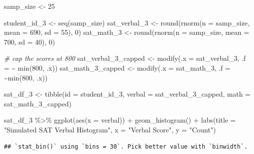\documentclass[
]{book}
\newenvironment{Shaded}{\begin{snugshade}}{\end{snugshade}}
\newcommand{\AttributeTok}[1]{\textcolor[rgb]{0.77,0.63,0.00}{#1}}
\newcommand{\CommentTok}[1]{\textcolor[rgb]{0.56,0.35,0.01}{\textit{#1}}}
\newcommand{\DecValTok}[1]{\textcolor[rgb]{0.00,0.00,0.81}{#1}}
\newcommand{\FunctionTok}[1]{\textcolor[rgb]{0.00,0.00,0.00}{#1}}
\newcommand{\NormalTok}[1]{#1}
\newcommand{\OtherTok}[1]{\textcolor[rgb]{0.56,0.35,0.01}{#1}}
\newcommand{\SpecialCharTok}[1]{\textcolor[rgb]{0.00,0.00,0.00}{#1}}
\newcommand{\StringTok}[1]{\textcolor[rgb]{0.31,0.60,0.02}{#1}}
\begin{document}
\begin{Shaded}
\begin{Highlighting}[]
\NormalTok{samp\_size }\OtherTok{\textless{}{-}} \DecValTok{25}

\NormalTok{student\_id\_3 }\OtherTok{\textless{}{-}} \FunctionTok{seq}\NormalTok{(samp\_size)}
\NormalTok{sat\_verbal\_3 }\OtherTok{\textless{}{-}} \FunctionTok{round}\NormalTok{(}\FunctionTok{rnorm}\NormalTok{(}\AttributeTok{n =}\NormalTok{ samp\_size, }\AttributeTok{mean =} \DecValTok{690}\NormalTok{, }\AttributeTok{sd =} \DecValTok{55}\NormalTok{), }\DecValTok{0}\NormalTok{)}
\NormalTok{sat\_math\_3 }\OtherTok{\textless{}{-}} \FunctionTok{round}\NormalTok{(}\FunctionTok{rnorm}\NormalTok{(}\AttributeTok{n =}\NormalTok{ samp\_size, }\AttributeTok{mean =} \DecValTok{700}\NormalTok{, }\AttributeTok{sd =} \DecValTok{40}\NormalTok{), }\DecValTok{0}\NormalTok{)}

\CommentTok{\# cap the scores at 800}
\NormalTok{sat\_verbal\_3\_capped }\OtherTok{\textless{}{-}} \FunctionTok{modify}\NormalTok{(}\AttributeTok{.x =}\NormalTok{ sat\_verbal\_3, }\AttributeTok{.f =} \SpecialCharTok{\textasciitilde{}} \FunctionTok{min}\NormalTok{(}\DecValTok{800}\NormalTok{, .x))}
\NormalTok{sat\_math\_3\_capped }\OtherTok{\textless{}{-}} \FunctionTok{modify}\NormalTok{(}\AttributeTok{.x =}\NormalTok{ sat\_math\_3, }\AttributeTok{.f =} \SpecialCharTok{\textasciitilde{}}\FunctionTok{min}\NormalTok{(}\DecValTok{800}\NormalTok{, .x))}



\NormalTok{sat\_df\_3 }\OtherTok{\textless{}{-}} \FunctionTok{tibble}\NormalTok{(}\AttributeTok{id =}\NormalTok{ student\_id\_3,}
                 \AttributeTok{verbal =}\NormalTok{ sat\_verbal\_3\_capped,}
                 \AttributeTok{math =}\NormalTok{ sat\_math\_3\_capped)}

\NormalTok{sat\_df\_3 }\SpecialCharTok{\%\textgreater{}\%} \FunctionTok{ggplot}\NormalTok{(}\FunctionTok{aes}\NormalTok{(}\AttributeTok{x =}\NormalTok{ verbal)) }\SpecialCharTok{+}
  \FunctionTok{geom\_histogram}\NormalTok{() }\SpecialCharTok{+}
  \FunctionTok{labs}\NormalTok{(}\AttributeTok{title =} \StringTok{"Simulated SAT Verbal Histogram"}\NormalTok{,}
       \AttributeTok{x =} \StringTok{"Verbal Score"}\NormalTok{,}
       \AttributeTok{y =} \StringTok{"Count"}\NormalTok{)}
\end{Highlighting}
\end{Shaded}

\begin{verbatim}
## `stat_bin()` using `bins = 30`. Pick better value with `binwidth`.
\end{verbatim}
\end{document}
